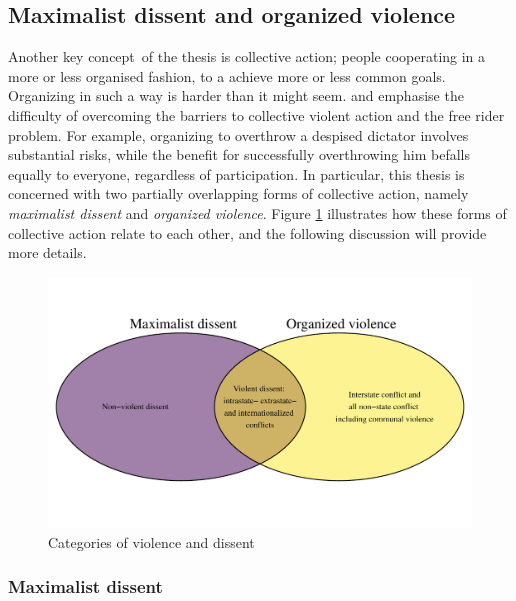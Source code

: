 \subsection{Maximalist dissent and organized violence}
\label{Maximalist dissent and organized violence}

Another key concept of the thesis is collective action; people cooperating in a
more or less organised fashion, to a achieve more or less common goals.
Organizing in such a way is harder than it might seem.
\citet{OlsonMancur1965TLoC} and \citet{Tullock_1971} emphasise the difficulty of
overcoming the barriers to collective violent action and the free rider problem.
For example, organizing to overthrow a despised dictator involves substantial
risks, while the benefit for successfully overthrowing him befalls equally to
everyone, regardless of participation. In particular, this thesis is concerned
with two partially overlapping forms of collective action, namely
\textit{maximalist dissent} and \textit{organized violence}. Figure \ref{venn}
illustrates how these forms of collective action relate to each other, and the
following discussion will provide more details.

\begin{figure}[hpbt]
	\centering
	\includegraphics[width=\textwidth]{../R/Output/venn.pdf}
	\caption{Categories of violence and dissent}
	\label{venn}
\end{figure}

\subsubsection{Maximalist dissent} \label{Maximalist dissent}


